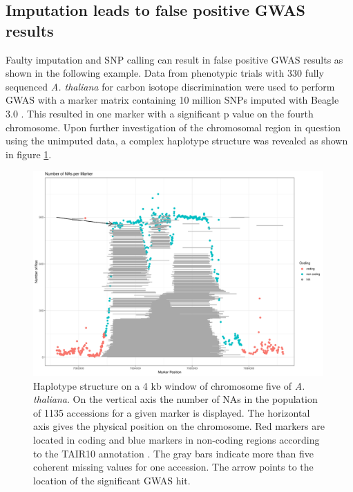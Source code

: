 \subsection{Imputation leads to false positive GWAS results}

Faulty imputation and SNP calling can result in false positive GWAS results as shown in
the following example. Data from phenotypic trials with 330 fully sequenced
\textit{A. thaliana} for carbon isotope discrimination were used to perform GWAS with a
marker matrix containing 10 million SNPs imputed with Beagle 3.0
\cite{dittberner2018natural}. This resulted in one marker with a significant p value on
the fourth chromosome. Upon further investigation of the chromosomal region in question
using the unimputed data, a complex haplotype structure was revealed as shown in figure
\ref{fig:chr_jul}.

\begin{figure}[H]
\centering
\includegraphics[height=.55\textheight, width=0.99\textwidth]{Figures/plot_NAs_AT}
\decoRule
\caption[Haplotype structure on a 1kb window of chromosome 4 of
\textit{A. thaliana}]{Haplotype structure on a 4 kb window of chromosome five of
  \textit{A. thaliana}. On the vertical axis the number of NAs in the population of 1135
  accessions for a given marker is displayed. The horizontal axis gives the physical
  position on the chromosome. Red markers are located in coding and blue markers in
  non-coding regions according to the TAIR10 annotation \cite{rhee2003arabidopsis}. The
  gray bars indicate more than five coherent missing values for one accession. The arrow
  points to the location of the significant GWAS hit.}
\label{fig:chr_jul}
\end{figure}

